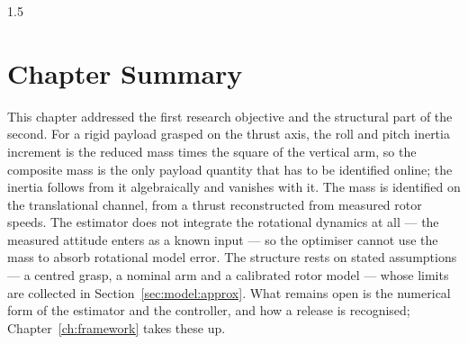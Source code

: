 \begin{spacing}{1.5}
\section{Chapter Summary}\label{sec:model:summary}

This chapter addressed the first research objective and the structural part of
the second. For a rigid payload grasped on the thrust axis, the roll and pitch
inertia increment is the reduced mass times the square of the vertical arm, so
the composite mass is the only payload quantity that has to be identified
online; the inertia follows from it algebraically and vanishes with it. The mass
is identified on the translational channel, from a thrust reconstructed from
measured rotor speeds. The estimator does not integrate the rotational
dynamics at all --- the measured attitude enters as a known input --- so the
optimiser cannot use the mass to absorb rotational model error. The structure rests on stated
assumptions --- a centred grasp, a nominal arm and a calibrated rotor model ---
whose limits are collected in Section~\ref{sec:model:approx}. What remains open
is the numerical form of the estimator and the controller, and how a release is
recognised; Chapter~\ref{ch:framework} takes these up.

\end{spacing}
\newpage
